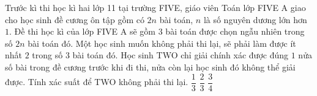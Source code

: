 \begin{ex}%
Trước kì thi học kì hai lớp 11 tại trường FIVE, giáo viên Toán lớp FIVE A giao cho học sinh đề cương ôn tập gồm có $2n$ bài toán, $n$ là số nguyên dương lớn hơn $1$. Đề thi học kì của lớp FIVE A sẽ gồm $3$ bài toán được chọn ngẫu nhiên trong số $2n$ bài toán đó. Một học sinh muốn không phải thi lại, sẽ phải làm được ít nhất $2$ trong số $3$ bài toán đó. Học sinh TWO chỉ giải chính xác được đúng $1$ nửa số bài trong đề cương trước khi đi thi, nửa còn lại học sinh đó không thể giải được. Tính xác suất để TWO không phải thi lại.
{$\dfrac{1}{3}$}
{$\dfrac{2}{3}$}
{$\dfrac{3}{4}$}
\end{ex}

